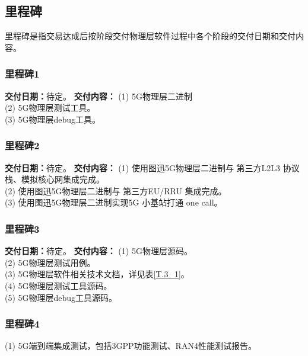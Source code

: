 \subsection{里程碑}
里程碑是指交易达成后按阶段交付物理层软件过程中各个阶段的交付日期和交付内容。

\subsubsection{里程碑1}
\textbf{交付日期：}待定。
\newline
\setlength{\hangindent}{2em}
\textbf{交付内容：}
\newline
\setlength{\hangindent}{2em}
(1) 5G物理层二进制\\
(2)	5G物理层测试工具。\\
(3)	5G物理层debug工具。 


\subsubsection{里程碑2}
\textbf{交付日期：}待定。
\newline
\setlength{\hangindent}{2em}
\textbf{交付内容：}
\newline
\setlength{\hangindent}{2em}
(1) 使用图迅5G物理层二进制与 第三方L2L3 协议栈、模拟核心网集成完成。\\
(2) 使用图迅5G物理层二进制与 第三方EU/RRU 集成完成。\\
(3) 使用图迅5G物理层二进制实现5G 小基站打通 one call。

\subsubsection{里程碑3}
\textbf{交付日期：}待定。
\newline
\setlength{\hangindent}{2em}
\textbf{交付内容：}
\newline
\setlength{\hangindent}{2em}
(1)	5G物理层源码。\\
(2)	5G物理层测试用例。\\
(3)	5G物理层软件相关技术文档，详见表\ref{T.3_1}。\\
(4)	5G物理层测试工具源码。\\
(5)	5G物理层debug工具源码。


\subsubsection{里程碑4}
(1)	5G端到端集成测试，包括3GPP功能测试、RAN4性能测试报告。

\newpage

